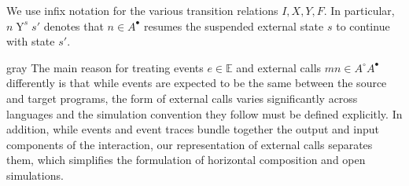 \documentclass[sigplan,10pt,review]{acmart}
\newcommand{\kw}[1]{\ensuremath{ \mathsf{#1} }}
\newcommand{\que}{\circ}
\newcommand{\ans}{\bullet}
\newenvironment{optional}{\begin{color}{gray}}{\end{color}}
\begin{document}
We use infix notation for the various transition relations
$I, X, Y, F$.
In particular, $n \mathrel{Y}^s s'$
denotes that $n \in A^\ans$
resumes the suspended external state $s$
to continue with state $s'$.
%
\begin{optional}
The main reason for treating
events $e \in \mathbb{E}$ and
external calls $m n \in A^\que A^\ans$
differently is that
while events are expected to be the same
between the source and target programs,
the form of external calls varies significantly
across languages
and the simulation convention they follow
must be defined explicitly.
In addition,
while events and event traces
bundle together the output and input
components of the interaction,
our representation of external calls
separates them,
which simplifies the formulation of
horizontal composition and open simulations.
\end{optional}

\end{document}
